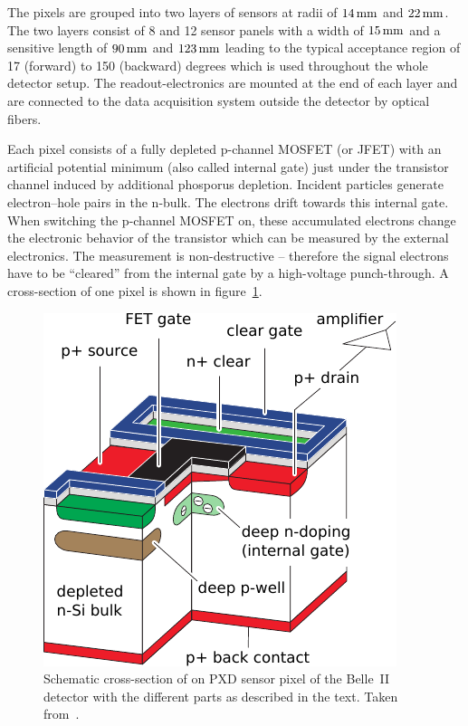 The pixels are grouped into two layers of sensors at radii of $\unit[14]{mm}$ and $\unit[22]{mm}$. The two layers consist of 8 and 12 sensor panels with a width of $\unit[15]{mm}$ and a sensitive length of $\unit[90]{mm}$ and $\unit[123]{mm}$ leading to the typical acceptance region of 17 (forward) to 150 (backward) degrees which is used throughout the whole detector setup. The readout-electronics are mounted at the end of each layer and are connected to the data acquisition system outside the detector by optical fibers.

Each pixel consists of a fully depleted p-channel MOSFET (or JFET) with an artificial potential minimum (also called internal gate) just under the transistor channel induced by additional phosporus depletion. Incident particles generate electron--hole pairs in the n-bulk. The electrons drift towards this internal gate. When switching the p-channel MOSFET on, these accumulated electrons change the electronic behavior of the transistor which can be measured by the external electronics. The measurement is non-destructive -- therefore the signal electrons have to be ``cleared'' from the internal gate by a high-voltage punch-through. A cross-section of one pixel is shown in figure~\ref{fig-pxd-schema}.

\begin{figure}[t]
  \centering
  \includegraphics[width=0.6\linewidth]{figures/experimental_setup/pxd.pdf}
  \caption[Cross-section of a PXD sensor]{Schematic cross-section of on PXD sensor pixel of the Belle~II detector with the different parts as described in the text. Taken from~\cite{tdr}.}
  \label{fig-pxd-schema}
\end{figure}


